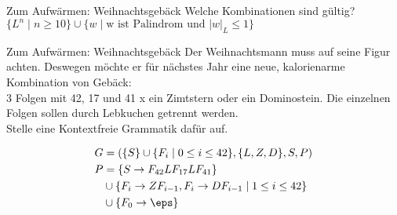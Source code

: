 {\begin{frame}{Zum Aufwärmen: Weihnachtsgebäck}
		Welche Kombinationen sind gültig?\\[0.5em] \pause
		$\{ L^n \mid n \geq 10\} \cup \{w \mid \text{w ist Palindrom und } |w|_L \leq 1\}$
	\end{frame}
	
	\begin{frame}{Zum Aufwärmen: Weihnachtsgebäck}
		Der Weihnachtsmann muss auf seine Figur achten. Deswegen möchte er für nächstes Jahr eine neue, kalorienarme Kombination von Gebäck:\\
		3 Folgen mit 42, 17 und 41 x ein Zimtstern oder ein Dominostein. Die einzelnen Folgen sollen durch Lebkuchen getrennt werden.\\
		Stelle eine Kontextfreie Grammatik dafür auf.
		
		\pause
		\begin{align*}
		G &= (\{S\} \cup \{F_i \mid 0 \leq i \leq 42 \}, \{L, Z, D\}, S, P)\\
		P &= \{S \to F_{42}LF_{17}LF_{41} \}\\
		&\cup \{F_i \to ZF_{i-1}, F_i \to DF_{i-1} \mid 1 \leq i \leq 42 \} \\
		&\cup \{F_0 \to \eps \}
		\end{align*}
	\end{frame}
}


